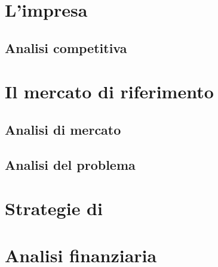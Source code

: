 \section{L'impresa}\label{sec:whoweare}

\subsection{Analisi competitiva}

\section{Il mercato di riferimento}\label{sec:whattheproblemis}
\subsection{Analisi di mercato}
\subsection{Analisi del problema}

\section{Strategie di \mktg}\label{sec:exitstrategy}

\section{Analisi finanziaria}

